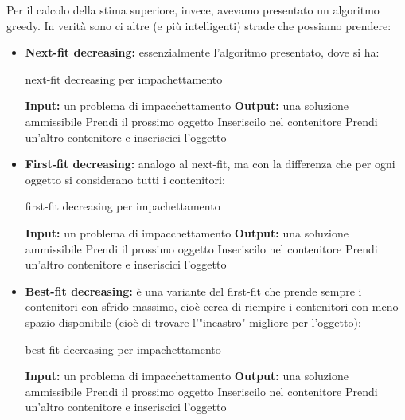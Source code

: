 \documentclass[a4paper,11pt]{article}
\begin{document}
Per il calcolo della stima superiore, invece, avevamo presentato un algoritmo greedy.
In verità sono ci altre (e più intelligenti) strade che possiamo prendere:

\begin{itemize}
	\item \textbf{Next-fit decreasing:} essenzialmente l'algoritmo presentato, dove si ha:
\begin{algorithm}[H]
\caption{next-fit decreasing per impachettamento}
\begin{algorithmic}
	\STATE \textbf{Input:} un problema di impacchettamento %
	\STATE \textbf{Output:} una soluzione ammissibile %
		\STATE Prendi il prossimo oggetto
			\STATE Inseriscilo nel contenitore
		\ELSE 
			\STATE Prendi un'altro contenitore e inseriscici l'oggetto
		\ENDIF
	\ENDWHILE
\end{algorithmic}
\end{algorithm}
	\item \textbf{First-fit decreasing:} analogo al next-fit, ma con la differenza che per ogni oggetto si considerano tutti i contenitori:
\begin{algorithm}[H]
\caption{first-fit decreasing per impachettamento}
\begin{algorithmic}
	\STATE \textbf{Input:} un problema di impacchettamento %
	\STATE \textbf{Output:} una soluzione ammissibile %
		\STATE Prendi il prossimo oggetto
			\STATE Inseriscilo nel contenitore
		\ELSE 
			\STATE Prendi un'altro contenitore e inseriscici l'oggetto
		\ENDIF
	\ENDWHILE
\end{algorithmic}
\end{algorithm}
	\item \textbf{Best-fit decreasing:} è una variante del first-fit che prende sempre i contenitori con sfrido massimo, cioè cerca di riempire i contenitori con meno spazio disponibile (cioè di trovare l'"incastro" migliore per l'oggetto):
\begin{algorithm}[H]
\caption{best-fit decreasing per impachettamento}
\begin{algorithmic}
	\STATE \textbf{Input:} un problema di impacchettamento %
	\STATE \textbf{Output:} una soluzione ammissibile %
		\STATE Prendi il prossimo oggetto
			\STATE Inseriscilo nel contenitore
		\ELSE 
			\STATE Prendi un'altro contenitore e inseriscici l'oggetto
		\ENDIF
	\ENDWHILE
\end{algorithmic}
\end{algorithm}
\end{itemize}
\end{document}
